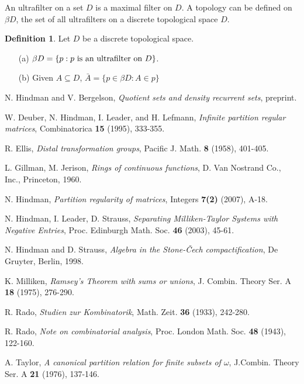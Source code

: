 \documentclass[12pt]{report}
\theoremstyle{definition}
\newtheorem{defin}[thm]{Definition}
\renewcommand{\baselinestretch}{1.5}\small\normalsize
\begin{document}
An ultrafilter on a set $D$ is a maximal filter on $D$.  A 
topology can be defined on $\beta D$, the set of all 
ultrafilters on a discrete topological space $D$.

\begin{defin}\label{HS 3.15}
Let $D$ be a discrete topological space.
\begin{itemize}
\item[(a)] $\beta{D}=\{p:p \hbox{ is an ultrafilter on } D\}$.
\item[(b)] Given $A\subseteq D$, $\bar{A}=\{p\in\beta{D}:A
\in p\}$
\end{itemize}
\end{defin}

\begin{thebibliography}{9}

\smallskip
\renewcommand{\baselinestretch}{1}\small\normalsize\bigskip

 N. Hindman and V. Bergelson, {\it Quotient sets
and density recurrent sets}, preprint.


 W. Deuber, N. Hindman, I. Leader, and H. Lefmann, 
{\it Infinite partition regular
matrices}, Combinatorica {\bf 15} (1995), 333-355.

 R. Ellis, {\it Distal transformation groups},
Pacific J. Math. {\bf 8} (1958), 401-405.

 L. Gillman, M. Jerison, {\it Rings of continuous
functions}, D. Van Nostrand Co., Inc., Princeton, 1960.

 N. Hindman, {\it Partition regularity of matrices},
Integers {\bf 7(2)} (2007), A-18.

 N. Hindman, I. Leader, D. Strauss, {\it Separating 
Milliken-Taylor Systems with Negative Entries\/}, Proc. Edinburgh Math. 
Soc. {\bf 46} (2003), 45-61.

 N. Hindman and D. Strauss, {\it Algebra in the Stone-\v Cech
compactification\/}, De Gruyter, Berlin, 1998.

 K. Milliken, {\it Ramsey's Theorem with sums or unions},
J. Combin. Theory Ser. A {\bf 18} (1975), 276-290.

 R. Rado, {\it Studien zur Kombinatorik}, Math. Zeit.
{\bf 36} (1933), 242-280.

 R. Rado, {\it Note on combinatorial analysis}, Proc.
London Math. Soc. {\bf 48} (1943), 122-160.

 A. Taylor, {\it A canonical partition relation for finite
subsets of $\omega$}, J.Combin. Theory Ser. A {\bf 21} (1976), 137-146.

\end{thebibliography}
\end{document}
